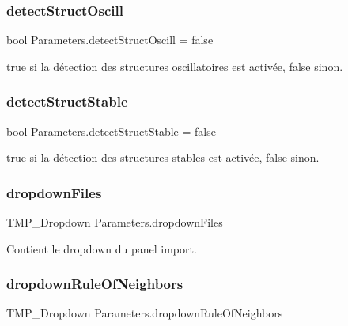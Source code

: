 \subsubsection{\texorpdfstring{detect\+Struct\+Oscill}{detectStructOscill}}
{\footnotesize\ttfamily bool Parameters.\+detect\+Struct\+Oscill = false\hspace{0.3cm}{\ttfamily [private]}}



true si la détection des structures oscillatoires est activée, false sinon. 

\mbox{\label{class_parameters_a9cee3a4a38b1085ad46833289acf1336}} 
\subsubsection{\texorpdfstring{detect\+Struct\+Stable}{detectStructStable}}
{\footnotesize\ttfamily bool Parameters.\+detect\+Struct\+Stable = false\hspace{0.3cm}{\ttfamily [private]}}



true si la détection des structures stables est activée, false sinon. 

\mbox{\label{class_parameters_ae4cea23bda0b2bc3955516a37e9d9993}} 
\subsubsection{\texorpdfstring{dropdown\+Files}{dropdownFiles}}
{\footnotesize\ttfamily T\+M\+P\+\_\+\+Dropdown Parameters.\+dropdown\+Files\hspace{0.3cm}{\ttfamily [private]}}



Contient le dropdown du panel import. 

\mbox{\label{class_parameters_a9bb907abb659026dbf7b4f64343aefa1}} 
\subsubsection{\texorpdfstring{dropdown\+Rule\+Of\+Neighbors}{dropdownRuleOfNeighbors}}
{\footnotesize\ttfamily T\+M\+P\+\_\+\+Dropdown Parameters.\+dropdown\+Rule\+Of\+Neighbors\hspace{0.3cm}{\ttfamily [private]}}



